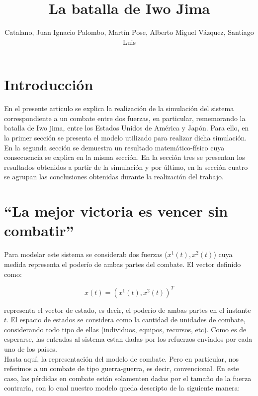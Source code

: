 \documentclass[a4paper,10pt]{article}
\title{La batalla de Iwo Jima}
\author{Catalano, Juan Ignacio \crcr Palombo, Martín \crcr Pose, Alberto Miguel \crcr Vázquez, Santiago Luis}
\date{}
\begin{document}
\maketitle


\newpage

\section{Introducci\'on}

En el presente art\'iculo se explica la realizaci\'on de la simulaci\'on del sistema correspondiente a un combate entre dos fuerzas, 
en particular, rememorando la batalla de Iwo jima, entre los Estados Unidos de Am\'erica y Jap\'on. Para ello, en la primer secci\'on se 
presenta el modelo utilizado para realizar dicha simulaci\'on. En la segunda secci\'on se demuestra un resultado matem\'atico-f\'isico cuya 
consecuencia se explica en la misma secci\'on. En la secci\'on tres se presentan los resultados obtenidos a partir de la simulaci\'on y 
por \'ultimo, en la secci\'on cuatro se agrupan las conclusiones obtenidas durante la realizaci\'on del trabajo.

\section{``La mejor victoria es vencer sin combatir''}
Para modelar este sistema se considerab dos fuerzas ($x^1(t), x^2(t)$) cuya medida representa el poderío de ambas partes del combate. El vector definido como:

\begin{equation}
x(t) = ( x^1(t), x^2(t) )^T \label{eq:state_vector}
\end{equation}

representa el vector de estado, es decir, el poderío de ambas partes en el instante $t$. El espacio de estados se considera como la cantidad de 
unidades de combate, considerando todo tipo de ellas (individuos, equipos, recursos, etc). Como es de esperarse, las entradas al sistema estan 
dadas por los refuerzos enviados por cada uno de los países.\\
Hasta aquí, la representación del modelo de combate. Pero en particular, nos referimos a un combate de tipo guerra-guerra, es decir, convencional.
En este caso, las pérdidas en combate están solamenten dadas por el tamaño de la fuerza contraria, con lo cual nuestro modelo queda descripto de la
siguiente manera:
\end{document}
